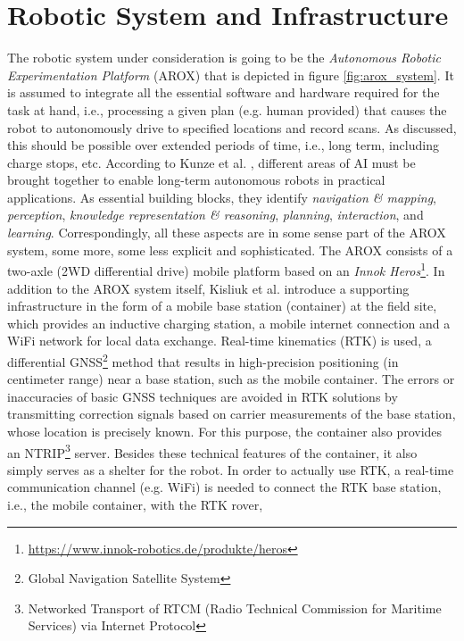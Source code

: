 \documentclass[english, master, utf8]{base/thesis_KBS}
\begin{document}
\section{Robotic System and Infrastructure}
\label{sec:robotic_system}

The robotic system under consideration is going to be the \textit{Autonomous Robotic Experimentation Platform} (AROX) \cite{Kisliuk:2021} that is depicted in figure \ref{fig:arox_system}.
It is assumed to integrate all the essential software and hardware required for the task at hand, i.e., processing a given plan (e.g. human provided) that causes the robot
to autonomously drive to specified locations and record scans. As discussed, this should be possible over extended periods of time, i.e., long term, including charge stops, etc.
According to Kunze et al. \cite{Kunze:2018}, different areas of AI must be brought together to enable long-term autonomous robots in practical applications.
As essential building blocks, they identify \textit{navigation \& mapping}, \textit{perception}, \textit{knowledge representation \& reasoning}, \textit{planning},
\textit{interaction}, and \textit{learning}. Correspondingly, all these aspects are in some sense part of the AROX system, some more, some less explicit and sophisticated.
The AROX consists of a two-axle (2WD differential drive) mobile platform based on an \textit{Innok Heros}\footnote{\textcolor{link-color}{\url{https://www.innok-robotics.de/produkte/heros}}}. \cite{Kisliuk:2021}
In addition to the AROX system itself, Kisliuk et al. introduce a supporting infrastructure in the form of a mobile base station (container) at the field site,
which provides an inductive charging station, a mobile internet connection and a WiFi network for local data exchange.
Real-time kinematics (RTK) is used, a differential GNSS\footnote{Global Navigation Satellite System} method that results in high-precision positioning (in centimeter range)
near a base station, such as the mobile container. The errors or inaccuracies of basic GNSS techniques are avoided in RTK solutions by transmitting correction signals based
on carrier measurements of the base station, whose location is precisely known. \cite{RTK_fundamentals} For this purpose, the container also provides an 
NTRIP\footnote{Networked Transport of RTCM (Radio Technical Commission for Maritime Services) via Internet Protocol} server.
Besides these technical features of the container, it also simply serves as a shelter for the robot.
In order to actually use RTK, a real-time communication channel (e.g. WiFi) is needed to connect the RTK base station, i.e., the mobile container, with the RTK rover,
\end{document}
